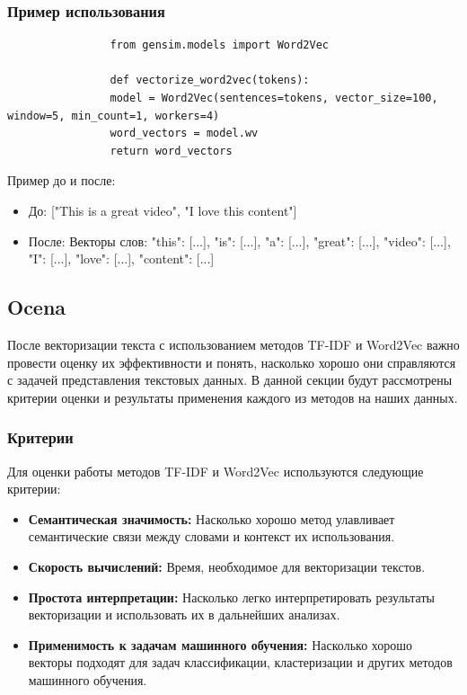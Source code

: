 	
 		\subsubsection{Пример использования}
 			\begin{verbatim}
				from gensim.models import Word2Vec
	
				def vectorize_word2vec(tokens):
				model = Word2Vec(sentences=tokens, vector_size=100, window=5, min_count=1, workers=4)
				word_vectors = model.wv
				return word_vectors
			\end{verbatim}

			Пример до и после:
			\begin{itemize}
				\item До: ["This is a great video", "I love this content"]
				\item После: Векторы слов: { "this": [...], "is": [...], "a": [...], "great": [...], "video": [...], "I": [...], "love": [...], "content": [...] }
			\end{itemize}
 	
 	\subsection{Ocena}
 		После векторизации текста с использованием методов TF-IDF и Word2Vec важно провести оценку их эффективности и понять, насколько хорошо они справляются с задачей представления текстовых данных. В данной секции будут рассмотрены критерии оценки и результаты применения каждого из методов на наших данных.
 	
 		\subsubsection{Критерии}
 			Для оценки работы методов TF-IDF и Word2Vec используются следующие критерии:

			\begin{itemize}
				\item \textbf{Семантическая значимость:} Насколько хорошо метод улавливает семантические связи 	между словами и контекст их использования.
				\item \textbf{Скорость вычислений:} Время, необходимое для векторизации текстов.
				\item \textbf{Простота интерпретации:} Насколько легко интерпретировать результаты векторизации и использовать их в дальнейших анализах.
				\item \textbf{Применимость к задачам машинного обучения:} Насколько хорошо векторы подходят для задач классификации, кластеризации и других методов машинного обучения.
			\end{itemize}
		
